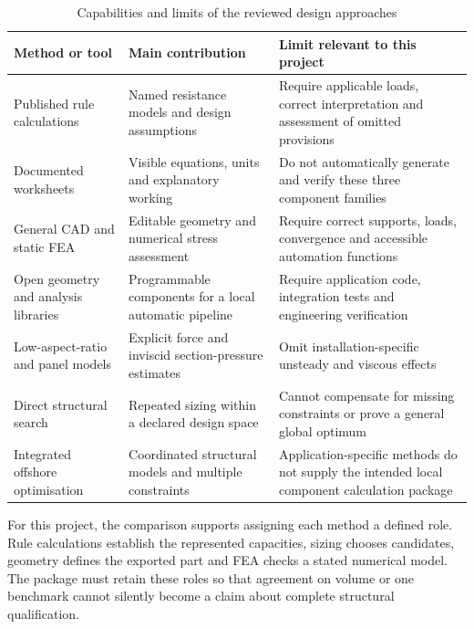 \begin{table}[H]
\centering
\caption{Capabilities and limits of the reviewed design approaches}
\label{tab:lit-methods}
\small
\begin{tabularx}{\textwidth}{p{}XX}
\toprule
Method or tool & Main contribution & Limit relevant to this project \\
\midrule
Published rule calculations \cite{asmeBTH1,aisc2016,iacsS10} & Named resistance models and design assumptions & Require applicable loads, correct interpretation and assessment of omitted provisions \\
Documented worksheets \cite{ptcMathcad} & Visible equations, units and explanatory working & Do not automatically generate and verify these three component families \\
General CAD and static FEA \cite{autodeskStaticStress,autodeskMesh} & Editable geometry and numerical stress assessment & Require correct supports, loads, convergence and accessible automation functions \\
Open geometry and analysis libraries \cite{gmsh2009,skfem2020,build123dDocs} & Programmable components for a local automatic pipeline & Require application code, integration tests and engineering verification \\
Low-aspect-ratio and panel models \cite{whicker1958,katz2001} & Explicit force and inviscid section-pressure estimates & Omit installation-specific unsteady and viscous effects \\
Direct structural search \cite{nelder1965,kolda2003} & Repeated sizing within a declared design space & Cannot compensate for missing constraints or prove a general global optimum \\
Integrated offshore optimisation \cite{gentils2017,zheng2023} & Coordinated structural models and multiple constraints & Application-specific methods do not supply the intended local component calculation package \\
\bottomrule
\end{tabularx}
\end{table}

For this project, the comparison supports assigning each method a defined role. Rule calculations establish the represented capacities, sizing chooses candidates, geometry defines the exported part and FEA checks a stated numerical model. The package must retain these roles so that agreement on volume or one benchmark cannot silently become a claim about complete structural qualification.

